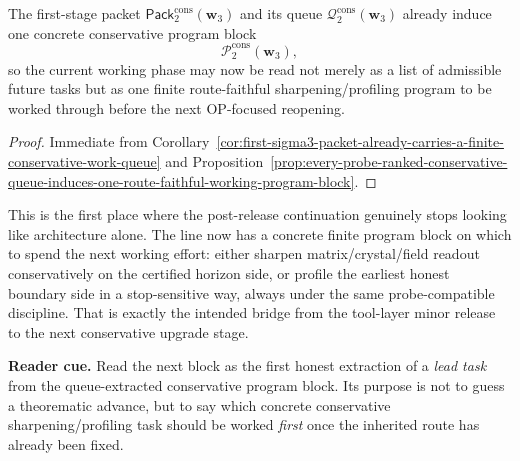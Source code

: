 \begin{corollary}
\label{cor:present-post-v3290-line-already-carries-a-first-concrete-conservative-working-program}
The first-stage packet \(\mathsf{Pack}^{\mathrm{cons}}_{2}(\mathbf w_3)\) and its queue \(\mathcal Q^{\mathrm{cons}}_{2}(\mathbf w_3)\) already induce one concrete conservative program block
\[
  \mathcal P^{\mathrm{cons}}_{2}(\mathbf w_3),
\]
so the current working phase may now be read not merely as a list of admissible future tasks but as one finite route-faithful sharpening/profiling program to be worked through before the next OP-focused reopening.
\end{corollary}

\begin{proof}
Immediate from Corollary~\ref{cor:first-sigma3-packet-already-carries-a-finite-conservative-work-queue} and Proposition~\ref{prop:every-probe-ranked-conservative-queue-induces-one-route-faithful-working-program-block}.
\end{proof}

\begin{remark}
\label{rem:what-this-first-concrete-program-block-now-buys}
This is the first place where the post-release continuation genuinely stops looking like architecture alone. The line now has a concrete finite program block on which to spend the next working effort: either sharpen matrix/crystal/field readout conservatively on the certified horizon side, or profile the earliest honest boundary side in a stop-sensitive way, always under the same probe-compatible discipline. That is exactly the intended bridge from the tool-layer minor release to the next conservative upgrade stage.
\end{remark}


\noindent\textbf{Reader cue.} Read the next block as the first honest extraction of a \emph{lead task} from the queue-extracted conservative program block. Its purpose is not to guess a theorematic advance, but to say which concrete conservative sharpening/profiling task should be worked \emph{first} once the inherited route has already been fixed.

